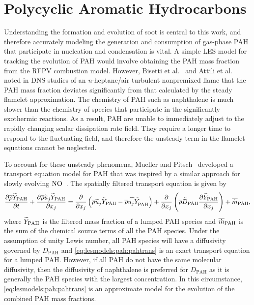 \section{Polycyclic Aromatic Hydrocarbons}
\label{sec:lesmodels:pah}

Understanding the formation and evolution of soot is central to this work, and therefore accurately modeling the generation and consumption of gas-phase PAH that participate in nucleation and condensation is vital. A simple LES model for tracking the evolution of PAH would involve obtaining the PAH mass fraction from the RFPV combustion model. However, Bisetti et al.~\cite{bisetti2012} and Attili et al.~\cite{attili2014} noted in DNS studies of an \textit{n}-heptane/air turbulent nonpremixed flame that the PAH mass fraction deviates significantly from that calculated by the steady flamelet approximation. The chemistry of PAH such as naphthalene is much slower than the chemistry of species that participate in the significantly exothermic reactions. As a result, PAH are unable to immediately adjust to the rapidly changing scalar dissipation rate field. They require a longer time to respond to the fluctuating field, and therefore the unsteady term in the flamelet equations cannot be neglected.

To account for these unsteady phenomena, Mueller and Pitsch~\cite{mueller2012} developed a transport equation model for PAH that was inspired by a similar approach for slowly evolving $\ce{NO}$~\cite{ihme2008}. The spatially filtered transport equation is given by
\begin{equation}\label{eq:lesmodels:pah:pahtrans}
  \ftrder{\tf{Y}_{\text{PAH}}} = \dsff[\tf{Y}_{\text{PAH}}]{\tf{u_j Y}_{\hspace{-3pt}\text{PAH}}} + \fdt[\text{PAH}]{\tf{Y}_{\text{PAH}}} + \fst[m]{\text{PAH}},
\end{equation}
where $\tf{Y}_{\text{PAH}}$ is the filtered mass fraction of a lumped PAH species and $\fst[m]{\text{PAH}}$ is the sum of the chemical source terms of all the PAH species. Under the assumption of unity Lewis number, all PAH species will have a diffusivity governed by $D_{\text{PAH}}$ and \cref{eq:lesmodels:pah:pahtrans} is an exact transport equation for a lumped PAH. However, if all PAH do not have the same molecular diffusivity, then the diffusivity of naphthalene is preferred for $D_{\text{PAH}}$ as it is generally the PAH species with the largest concentration. In this circumstance, \cref{eq:lesmodels:pah:pahtrans} is an approximate model for the evolution of the combined PAH mass fractions.


